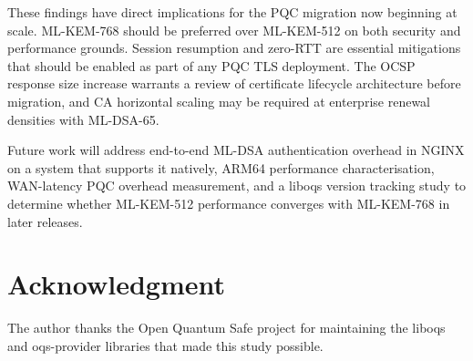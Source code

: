 \documentclass[conference]{IEEEtran}
\begin{document}
These findings have direct implications for the PQC migration now beginning at scale.
ML-KEM-768 should be preferred over ML-KEM-512 on both security and performance grounds.
Session resumption and zero-RTT are essential mitigations that should be enabled as part
of any PQC TLS deployment. The OCSP response size increase warrants a review of
certificate lifecycle architecture before migration, and CA horizontal scaling may be
required at enterprise renewal densities with ML-DSA-65.

Future work will address end-to-end ML-DSA authentication overhead in NGINX on a system
that supports it natively, ARM64 performance characterisation, WAN-latency PQC overhead
measurement, and a liboqs version tracking study to determine whether ML-KEM-512
performance converges with ML-KEM-768 in later releases.

\section*{Acknowledgment}

The author thanks the Open Quantum Safe project for maintaining the liboqs and
oqs-provider libraries that made this study possible.
\end{document}
